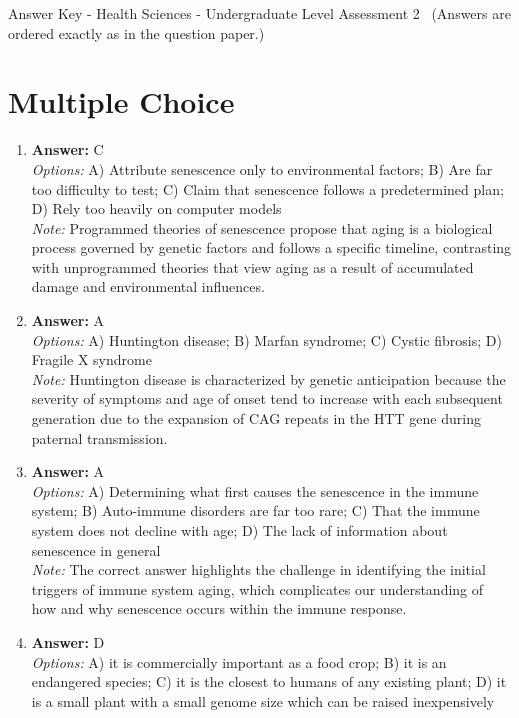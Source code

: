 \documentclass[12pt]{article}
\begin{document}
\begin{center}
Answer Key - Health Sciences - Undergraduate Level Assessment 2 \
\small (Answers are ordered exactly as in the question paper.)
\end{center}

\section*{Multiple Choice}
\begin{enumerate}[label=\arabic*.]
\item \textbf{Answer:} C
\\ \textit{Options:} A) Attribute senescence only to environmental factors; B) Are far too difficulty to test; C) Claim that senescence follows a predetermined plan; D) Rely too heavily on computer models
\\ \textit{Note:} Programmed theories of senescence propose that aging is a biological process governed by genetic factors and follows a specific timeline, contrasting with unprogrammed theories that view aging as a result of accumulated damage and environmental influences.
\item \textbf{Answer:} A
\\ \textit{Options:} A) Huntington disease; B) Marfan syndrome; C) Cystic fibrosis; D) Fragile X syndrome
\\ \textit{Note:} Huntington disease is characterized by genetic anticipation because the severity of symptoms and age of onset tend to increase with each subsequent generation due to the expansion of CAG repeats in the HTT gene during paternal transmission.
\item \textbf{Answer:} A
\\ \textit{Options:} A) Determining what first causes the senescence in the immune system; B) Auto-immune disorders are far too rare; C) That the immune system does not decline with age; D) The lack of information about senescence in general
\\ \textit{Note:} The correct answer highlights the challenge in identifying the initial triggers of immune system aging, which complicates our understanding of how and why senescence occurs within the immune response.
\item \textbf{Answer:} D
\\ \textit{Options:} A) it is commercially important as a food crop; B) it is an endangered species; C) it is the closest to humans of any existing plant; D) it is a small plant with a small genome size which can be raised inexpensively

\end{enumerate}
\end{document}
